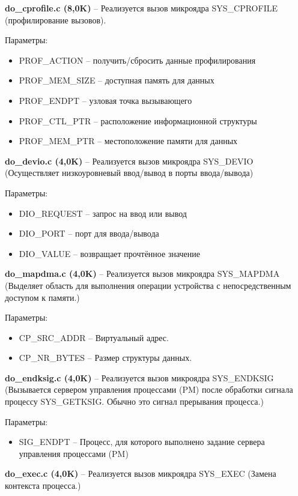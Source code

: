 \textbf{do\_cprofile.c (8,0K)} -- Реализуется вызов микроядра SYS\_CPROFILE (профилирование вызовов).

Параметры:
\begin{itemize}
\item PROF\_ACTION -- получить/сбросить данные профилирования
\item PROF\_MEM\_SIZE -- доступная память для данных
\item PROF\_ENDPT -- узловая точка вызывающего
\item PROF\_CTL\_PTR -- расположение информационной структуры
\item PROF\_MEM\_PTR -- местоположение памяти для данных
\end{itemize}

\textbf{do\_devio.c (4,0K)} -- Реализуется вызов микроядра SYS\_DEVIO (Осуществляет низкоуровневый ввод/вывод в порты ввода/вывода)

Параметры:
\begin{itemize}
\item DIO\_REQUEST -- запрос на ввод или вывод
\item DIO\_PORT -- порт для ввода/вывода
\item DIO\_VALUE -- возвращает прочтённое значение
\end{itemize}

\textbf{do\_mapdma.c (4,0K)} -- Реализуется вызов микроядра SYS\_MAPDMA (Выделяет область для выполнения операции устройства с непосредственным доступом к памяти.)

Параметры:
\begin{itemize}
\item CP\_SRC\_ADDR -- Виртуальный адрес.
\item CP\_NR\_BYTES -- Размер структуры данных.
\end{itemize}

\textbf{do\_endksig.c (4,0K)} -- Реализуется вызов микроядра SYS\_ENDKSIG (Вызывается сервером управления процессами (PM) после обработки сигнала процессу SYS\_GETKSIG. Обычно это сигнал прерывания процесса.)

Параметры:
\begin{itemize}
\item SIG\_ENDPT -- Процесс, для которого выполнено задание сервера управления процессами (PM)
\end{itemize}

\textbf{do\_exec.c (4,0K)} -- Реализуется вызов микроядра SYS\_EXEC (Замена контекста процесса.)

